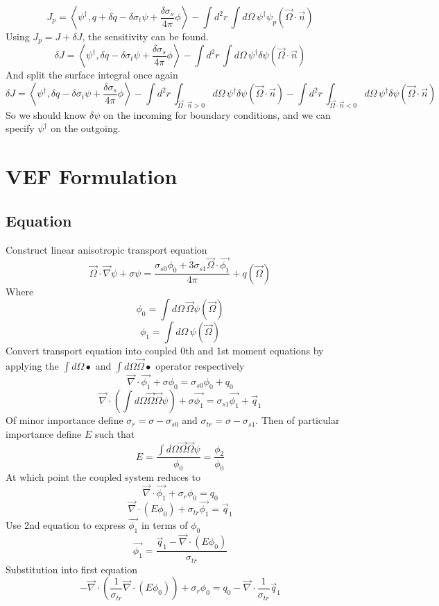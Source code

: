 \documentclass{article}
\newcommand{\vOmega}{\vec{\Omega}}
\newcommand{\vO}{\vec{\Omega}}
\newcommand{\bra}{\left\langle}
\newcommand{\ket}{\right\rangle}
\newcommand{\vdiv}{\vec{\nabla} \cdot}
\begin{document}
\[
J_p = \bra \psi^\dag ,  q + \delta q - \delta \sigma_t \psi + \frac{ \delta \sigma_s }{4 \pi}  \phi     \ket -  \int d^2 r \, \int d  \Omega \, \psi^\dag \psi_p ( \vO \cdot \vec{n})
\] 
Using $J_p = J + \delta J$, the sensitivity can be found. 
\[
\delta J = \bra \psi^\dag ,  \delta q - \delta \sigma_t \psi + \frac{ \delta \sigma_s }{4 \pi}  \phi    \ket -  \int d^2 r \, \int d  \Omega \, \psi^\dag \delta \psi ( \vO \cdot \vec{n})
\] 
And split the surface integral once again
\[
\delta J = \bra \psi^\dag ,  \delta q - \delta \sigma_t \psi + \frac{ \delta \sigma_s }{4 \pi}  \phi    \ket
- \int d^2 r \, \int_{\vO \cdot \vec{n} >0} d  \Omega \, \psi^\dag \delta \psi ( \vO \cdot \vec{n} ) 
- \int d^2 r \, \int_{\vO \cdot \vec{n} <0} d  \Omega \, \psi^\dag \delta \psi ( \vO \cdot \vec{n} )
\]
So we should know $\delta \psi$ on the incoming for boundary conditions, and we can specify $\psi^\dag$ on the outgoing.

\section{VEF Formulation}
\subsection{Equation}
Construct linear anisotropic transport equation
\[
\vOmega \cdot \vec{\nabla} \psi + \sigma \psi = \frac{\sigma_{s0} \phi_0 + 3 \sigma_{s1} \vOmega \cdot \vec{\phi_1}}{4 \pi} + q( \vO )
\]
Where
\[
\phi_0=\int d\Omega \, \vO \psi( \vO )
\]
\[
\phi_1=\int d\Omega \, \psi( \vO )
\]
Convert transport equation into coupled 0th and 1st moment equations by applying the $\int d\Omega \bullet $ and $\int d\Omega \vO \bullet$ operator respectively 
\[
\vec{\nabla} \cdot \vec{\phi_1} + \sigma \phi_0 = \sigma_{s0} \phi_0 + q_0
 \]
 \[
\vec{\nabla} \cdot \left(  \int d\Omega \vO \vO \psi \right) + \sigma \vec{\phi_1} =\sigma_{s1} \vec{\phi_1} + \vec{q}_1
 \]
 Of minor importance define $\sigma_r=\sigma-\sigma_{s0}$ and  $\sigma_{tr}=\sigma-\sigma_{s1}$. Then of particular importance define $E$ such that 
 \[
 E=\frac{\int d\Omega \vO \vO \psi}{\phi_0} = \frac{\phi_2}{\phi_0}
 \]
 At which point the coupled system reduces to
 \[
\vec{\nabla} \cdot \vec{\phi_1} + \sigma_r \phi_0 = q_0
 \]
 \[
\vec{\nabla} \cdot \left(E \phi_0 \right) + \sigma_{tr} \vec{\phi_1} =  \vec{q}_1
 \]
 Use 2nd equation to express $\vec{\phi_1}$ in terms of $\phi_0$
\[
\vec{\phi_1}=\frac{\vec{q}_1 - \vec{\nabla} \cdot \left(E \phi_0 \right)  }{\sigma_{tr} }
\]
Substitution into first equation
\[
-\vdiv \left( \frac{1}{\sigma_{tr}} \vdiv \left( E \phi_0 \right) \right) + \sigma_r \phi_0 = q_0 -  \vec{\nabla} \cdot \frac{1}{\sigma_{tr}} \vec{q}_1 
\]
\end{document}
